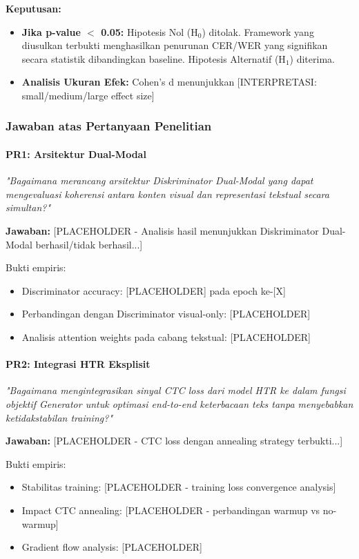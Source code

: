 \documentclass{article}
\begin{document}
\textbf{Keputusan:}
\begin{itemize}
    \item \textbf{Jika p-value $<$ 0.05:} Hipotesis Nol (H$_0$) ditolak. Framework yang diusulkan terbukti menghasilkan penurunan CER/WER yang signifikan secara statistik dibandingkan baseline. Hipotesis Alternatif (H$_1$) diterima.
    \item \textbf{Analisis Ukuran Efek:} Cohen's d menunjukkan [INTERPRETASI: small/medium/large effect size]
\end{itemize}

\subsubsection{Jawaban atas Pertanyaan Penelitian}

\paragraph{PR1: Arsitektur Dual-Modal}

\textit{"Bagaimana merancang arsitektur Diskriminator Dual-Modal yang dapat mengevaluasi koherensi antara konten visual dan representasi tekstual secara simultan?"}

\textbf{Jawaban:} [PLACEHOLDER - Analisis hasil menunjukkan Diskriminator Dual-Modal berhasil/tidak berhasil...]

Bukti empiris:
\begin{itemize}
    \item Discriminator accuracy: [PLACEHOLDER] pada epoch ke-[X]
    \item Perbandingan dengan Discriminator visual-only: [PLACEHOLDER]
    \item Analisis attention weights pada cabang tekstual: [PLACEHOLDER]
\end{itemize}

\paragraph{PR2: Integrasi HTR Eksplisit}

\textit{"Bagaimana mengintegrasikan sinyal CTC loss dari model HTR ke dalam fungsi objektif Generator untuk optimasi end-to-end keterbacaan teks tanpa menyebabkan ketidakstabilan training?"}

\textbf{Jawaban:} [PLACEHOLDER - CTC loss dengan annealing strategy terbukti...]

Bukti empiris:
\begin{itemize}
    \item Stabilitas training: [PLACEHOLDER - training loss convergence analysis]
    \item Impact CTC annealing: [PLACEHOLDER - perbandingan warmup vs no-warmup]
    \item Gradient flow analysis: [PLACEHOLDER]
\end{itemize}
\end{document}
